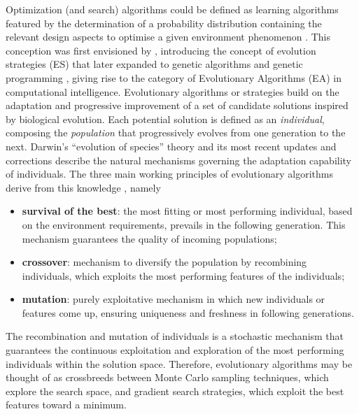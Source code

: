 Optimization (and search) algorithms could be defined as learning algorithms featured by the determination of a probability distribution containing the relevant design aspects to optimise a given environment phenomenon \citep{BruntonNoackKoumoutsakos2020}. This conception was first envisioned by \citet{Schwefel1977}, introducing the concept of evolution strategies (ES) that later expanded to genetic algorithms \citep[GAs,][]{holland1992adaptation} and genetic programming \citep[GP,][]{Koza1994gp}, giving rise to the category of Evolutionary Algorithms (EA) in computational intelligence. Evolutionary algorithms or strategies build on the adaptation and progressive improvement of a set of candidate solutions inspired by biological evolution. Each potential solution is defined as an \textit{individual}, composing the \textit{population} that progressively evolves from one generation to the next. Darwin's ``evolution of species'' theory and its most recent updates and corrections describe the natural mechanisms governing the adaptation capability of individuals. The three main working principles of evolutionary algorithms derive from this knowledge \citep{duriez2017book,cornejomacedaPhD}, namely 
%
\begin{itemize}
    \item \textbf{survival of the best}: the most fitting or most performing individual, based on the environment requirements, prevails in the following generation. This mechanism guarantees the quality of incoming populations;
    \item \textbf{crossover}: mechanism to diversify the population by recombining individuals, which exploits the most performing features of the individuals;
    \item \textbf{mutation}: purely exploitative mechanism in which new individuals or features come up, ensuring uniqueness and freshness in following generations.
\end{itemize}
%
The recombination and mutation of individuals is a stochastic mechanism that guarantees the continuous exploitation and exploration of the most performing individuals within the solution space. Therefore, evolutionary algorithms may be thought of as crossbreeds between Monte Carlo sampling techniques, which explore the search space, and gradient search strategies, which exploit the best features toward a minimum.

